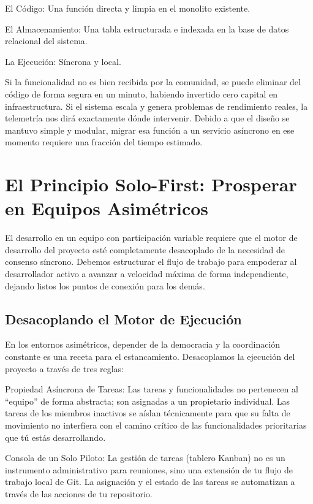 \documentclass[14pt,a4paper,oneside]{extbook}
\begin{document}
El Código: Una función directa y limpia en el monolito existente.

El Almacenamiento: Una tabla estructurada e indexada en la base de datos relacional del sistema.

La Ejecución: Síncrona y local.

Si la funcionalidad no es bien recibida por la comunidad, se puede eliminar del código de forma segura en un minuto, habiendo invertido cero capital en infraestructura. Si el sistema escala y genera problemas de rendimiento reales, la telemetría nos dirá exactamente dónde intervenir. Debido a que el diseño se mantuvo simple y modular, migrar esa función a un servicio asíncrono en ese momento requiere una fracción del tiempo estimado.


\chapter{El Principio Solo-First: Prosperar en Equipos Asimétricos}

El desarrollo en un equipo con participación variable requiere que el motor de desarrollo del proyecto esté completamente desacoplado de la necesidad de consenso síncrono. Debemos estructurar el flujo de trabajo para empoderar al desarrollador activo a avanzar a velocidad máxima de forma independiente, dejando listos los puntos de conexión para los demás.

\section{Desacoplando el Motor de Ejecución}

En los entornos asimétricos, depender de la democracia y la coordinación constante es una receta para el estancamiento. Desacoplamos la ejecución del proyecto a través de tres reglas:

Propiedad Asíncrona de Tareas: Las tareas y funcionalidades no pertenecen al \enquote{equipo} de forma abstracta; son asignadas a un propietario individual. Las tareas de los miembros inactivos se aíslan técnicamente para que su falta de movimiento no interfiera con el camino crítico de las funcionalidades prioritarias que tú estás desarrollando.

Consola de un Solo Piloto: La gestión de tareas (tablero Kanban) no es un instrumento administrativo para reuniones, sino una extensión de tu flujo de trabajo local de Git. La asignación y el estado de las tareas se automatizan a través de las acciones de tu repositorio.
\end{document}
